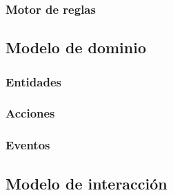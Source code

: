\subsubsection{Motor de reglas}
\subsection{Modelo de dominio}
\subsubsection{Entidades}
\subsubsection{Acciones}
\subsubsection{Eventos}
\subsection{Modelo de interacción}


